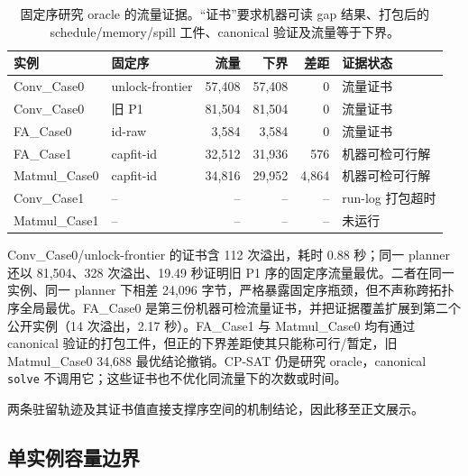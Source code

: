 \begin{table}[htbp]\centering\small
\caption{固定序研究 oracle 的流量证据。“证书”要求机器可读 gap 结果、打包后的 schedule/memory/spill 工件、canonical 验证及流量等于下界。}
\label{tab:supp-exact-zh}
\begin{tabular}{llrrrl}\toprule
实例 & 固定序 & 流量 & 下界 & 差距 & 证据状态\\\midrule
Conv\_Case0 & unlock-frontier & 57,408 & 57,408 & 0 & 流量证书\\
Conv\_Case0 & 旧 P1 & 81,504 & 81,504 & 0 & 流量证书\\
FA\_Case0 & id-raw & 3,584 & 3,584 & 0 & 流量证书\\
FA\_Case1 & capfit-id & 32,512 & 31,936 & 576 & 机器可检可行解\\
Matmul\_Case0 & capfit-id & 34,816 & 29,952 & 4,864 & 机器可检可行解\\
Conv\_Case1 & -- & -- & -- & -- & run-log 打包超时\\
Matmul\_Case1 & -- & -- & -- & -- & 未运行\\\bottomrule
\end{tabular}\end{table}

Conv\_Case0/unlock-frontier 的证书含 112 次溢出，耗时 0.88 秒；同一 planner 还以 81,504、328 次溢出、19.49 秒证明旧 P1 序的固定序流量最优。二者在同一实例、同一 planner 下相差 24,096 字节，严格暴露固定序瓶颈，但不声称跨拓扑序全局最优。FA\_Case0 是第三份机器可检流量证书，并把证据覆盖扩展到第二个公开实例（14 次溢出，2.17 秒）。FA\_Case1 与 Matmul\_Case0 均有通过 canonical 验证的打包工件，但正的下界差距使其只能称可行/暂定，旧 Matmul\_Case0 34,688 最优结论撤销。CP-SAT 仍是研究 oracle，canonical \texttt{solve} 不调用它；这些证书也不优化同流量下的次数或时间。

两条驻留轨迹及其证书值直接支撑序空间的机制结论，因此移至正文展示。

\clearpage
\subsection{单实例容量边界}\label{sec:supp-robustness-zh}

